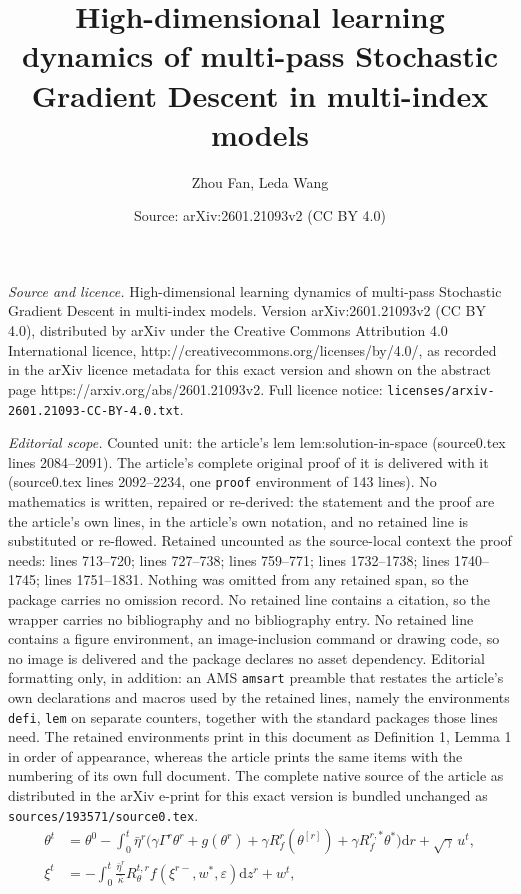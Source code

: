 \documentclass[10pt,a4paper]{amsart}
\title{High-dimensional learning dynamics of multi-pass Stochastic Gradient Descent in multi-index models}
\author{Zhou Fan, Leda Wang}
\date{Source: arXiv:2601.21093v2 (CC BY 4.0)}
\def\d{\mathrm{d}}
\def\eps{\varepsilon}
\begin{document}
\maketitle

\noindent\emph{Source and licence.} High-dimensional learning dynamics of multi-pass Stochastic Gradient Descent in multi-index models. Version arXiv:2601.21093v2 (CC BY 4.0), distributed by arXiv under the Creative Commons Attribution 4.0 International licence, http://creativecommons.org/licenses/by/4.0/, as recorded in the arXiv licence metadata for this exact version and shown on the abstract page https://arxiv.org/abs/2601.21093v2. Full licence notice: \texttt{licenses/arxiv-2601.21093-CC-BY-4.0.txt}.\par\smallskip

\noindent\textit{Editorial scope.} Counted unit: the article's lem lem:solution-in-space (source0.tex lines 2084--2091). The article's complete original proof of it is delivered with it (source0.tex lines 2092--2234, one \texttt{proof} environment of 143 lines). No mathematics is written, repaired or re-derived: the statement and the proof are the article's own lines, in the article's own notation, and no retained line is substituted or re-flowed.  Retained uncounted as the source-local context the proof needs: lines 713--720; lines 727--738; lines 759--771; lines 1732--1738; lines 1740--1745; lines 1751--1831.  Nothing was omitted from any retained span, so the package carries no omission record.  No retained line contains a citation, so the wrapper carries no bibliography and no bibliography entry.  No retained line contains a figure environment, an image-inclusion command or drawing code, so no image is delivered and the package declares no asset dependency.  Editorial formatting only, in addition: an AMS \texttt{amsart} preamble that restates the article's own declarations and macros used by the retained lines, namely the environments \texttt{defi}, \texttt{lem} on separate counters, together with the standard packages those lines need.  The retained environments print in this document as Definition 1, Lemma 1 in order of appearance, whereas the article prints the same items with the numbering of its own full document.  The complete native source of the article as distributed in the arXiv e-print for this exact version is bundled unchanged as \texttt{sources/193571/source0.tex}.
\begin{align}
\theta^t&=\theta^0-\int_0^t \bar\eta^r \Big({\gamma}\Gamma^r
\theta^r+g(\theta^r)+{\gamma}R_f^r(\theta^{[r]})+
{\gamma}R_f^{r,*}\theta^*\Big)\d r+\sqrt{\gamma}\,u^t,
\label{eq:def-cont-theta}\\
\xi^t&={-}\int_0^t \frac{\bar\eta^r}{\bar\kappa} R_\theta^{t,r}
f(\xi^{r-},w^*,\eps)\d z^r+w^t,\label{eq:def-cont-xi}
\end{align}
\end{document}

